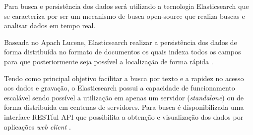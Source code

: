 Para busca e persistência dos dados será utilizado a tecnologia Elasticsearch que se caracteriza por ser um mecanismo de busca open-source que realiza buscas e analisar dados em tempo real.

Baseada no Apach Lucene, Elasticsearch realizar a persistência dos dados de forma distribuída no formato de documentos os quais indexa todos os campos para que posteriormente seja possível a localização de forma rápida \cite{Gormley:2015}.

Tendo como principal objetivo facilitar a busca por texto e a rapidez no acesso aos dados e gravação, 
o Elasticsearch possui a capacidade de funcionamento escalável sendo possível a utilização em apenas um servidor (\textit{standalone}) ou de forma distribuída em centenas de servidores.
Para busca é disponibilizada uma interface RESTful API que possibilita a obtenção e visualização dos dados por aplicações \textit{web client} \cite{Gormley:2015}.

